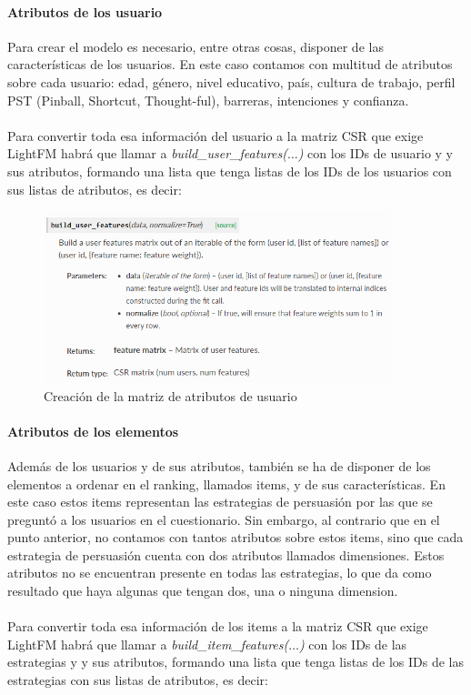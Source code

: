 \paragraph{Atributos de los usuario}
Para crear el modelo es necesario, entre otras cosas, disponer de las características de los usuarios. En este caso contamos con multitud de atributos sobre cada usuario: edad, género, nivel educativo, país, cultura de trabajo, perfil PST (Pinball, Shortcut, Thought-ful), barreras, intenciones y confianza.
\\ \\
Para convertir toda esa información del usuario a la matriz CSR que exige LightFM habrá que llamar a \textit{build\_user\_features($\ldots$)} con los IDs de usuario y y sus atributos, formando una lista que tenga listas de los IDs de los usuarios con sus listas de atributos, es decir:

\begin{figure}[H]
    \centering
    \includegraphics[width=0.9\textwidth]{Figuras/LightFM_build_user_features.png}    
    \caption{Creación de la matriz de atributos de usuario} 
    \label{fig:BuildUserFeatures}
\end{figure}

\paragraph{Atributos de los elementos}
Además de los usuarios y de sus atributos, también se ha de disponer de los elementos a ordenar en el ranking, llamados items, y de sus características. En este caso estos items representan las estrategias de persuasión por las que se preguntó a los usuarios en el cuestionario. Sin embargo, al contrario que en el punto anterior, no contamos con tantos atributos sobre estos items, sino que cada estrategia de persuasión cuenta con dos atributos llamados dimensiones. Estos atributos no se encuentran presente en todas las estrategias, lo que da como resultado que haya algunas que tengan dos, una o ninguna dimension.
\\ \\
Para convertir toda esa información de los items a la matriz CSR que exige LightFM habrá que llamar a \textit{build\_item\_features($\ldots$)} con los IDs de las estrategias y y sus atributos, formando una lista que tenga listas de los IDs de las estrategias con sus listas de atributos, es decir:

